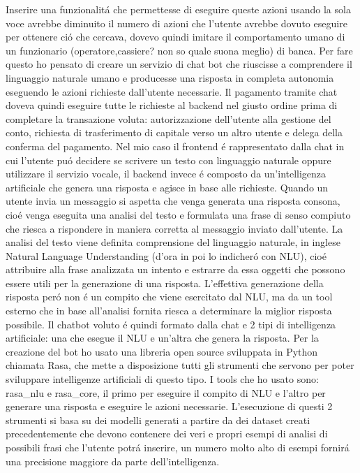 Inserire una funzionalit\'a che permettesse di eseguire queste azioni usando la sola voce avrebbe diminuito il numero di azioni che l'utente avrebbe dovuto eseguire per ottenere ci\'o che cercava, dovevo quindi imitare il comportamento umano di un funzionario (operatore,cassiere? non so quale suona meglio) di banca. Per fare questo ho pensato di creare un servizio di chat bot che riuscisse a comprendere il linguaggio naturale umano e producesse una risposta in completa autonomia eseguendo le azioni richieste dall'utente necessarie.
Il pagamento tramite chat doveva quindi eseguire tutte le richieste al backend nel giusto ordine prima di completare la transazione voluta: autorizzazione dell'utente alla gestione del conto, richiesta di trasferimento di capitale verso un altro utente e delega della conferma del pagamento.
Nel mio caso il frontend \'e rappresentato dalla chat in cui l'utente pu\'o decidere se scrivere un testo con linguaggio naturale oppure utilizzare il servizio vocale, il backend invece \'e composto da un'intelligenza artificiale che genera una risposta e agisce in base alle richieste.
Quando un utente invia un messaggio si aspetta che venga generata una risposta consona, cio\'e venga eseguita una analisi del testo e formulata una frase di senso compiuto che riesca a rispondere in maniera corretta al messaggio inviato dall'utente. La analisi del testo viene definita comprensione del linguaggio naturale, in inglese Natural Language Understanding (d'ora in poi lo indicher\'o con NLU), cio\'e attribuire alla frase analizzata un intento e estrarre da essa oggetti che possono essere utili per la generazione di una risposta. L'effettiva generazione della risposta per\'o non \'e un compito che viene esercitato dal NLU, ma da un tool esterno che in base all'analisi fornita riesca a determinare la miglior risposta possibile.
Il chatbot voluto \'e quindi formato dalla chat e 2 tipi di intelligenza artificiale: una che esegue il NLU e un'altra che genera la risposta.
Per la creazione del bot ho usato una libreria open source sviluppata in Python chiamata Rasa, che mette a disposizione tutti gli strumenti che servono per poter sviluppare intelligenze artificiali di questo tipo. I tools che ho usato sono: rasa\_nlu e rasa\_core, il primo per eseguire il compito di NLU e l'altro per generare una risposta e eseguire le azioni necessarie.
L'esecuzione di questi 2 strumenti si basa su dei modelli generati a partire da dei dataset creati precedentemente che devono contenere dei veri e propri esempi di analisi di possibili frasi che l'utente potr\'a inserire, un numero molto alto di esempi fornir\'a una precisione maggiore da parte dell'intelligenza.
